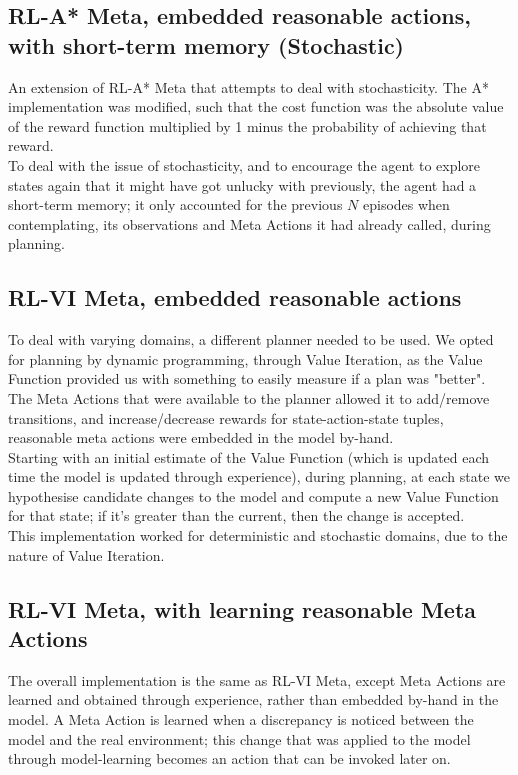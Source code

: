 \subsection{RL-A* Meta, embedded reasonable actions, with short-term memory (Stochastic)}
An extension of RL-A* Meta that attempts to deal with stochasticity. The A* implementation was modified, such that the cost function was the absolute value of the reward function multiplied by 1 minus the probability of achieving that reward.
\\To deal with the issue of stochasticity, and to encourage the agent to explore states again that it might have got unlucky with previously, the agent had a short-term memory; it only accounted for the previous $N$ episodes when contemplating, its observations and Meta Actions it had already called, during planning.
\subsection{RL-VI Meta, embedded reasonable actions}
To deal with varying domains, a different planner needed to be used. We opted for planning by dynamic programming, through Value Iteration, as the Value Function provided us with something to easily measure if a plan was "better".
\\The Meta Actions that were available to the planner allowed it to add/remove transitions, and increase/decrease rewards for state-action-state tuples, reasonable meta actions were embedded in the model by-hand.
\\Starting with an initial estimate of the Value Function (which is updated each time the model is updated through experience), during planning, at each state we hypothesise candidate changes to the model and compute a new Value Function for that state; if it's greater than the current, then the change is accepted.
\\This implementation worked for deterministic and stochastic domains, due to the nature of Value Iteration.
\subsection{RL-VI Meta, with learning reasonable Meta Actions}
The overall implementation is the same as RL-VI Meta, except Meta Actions are learned and obtained through experience, rather than embedded by-hand in the model. A Meta Action is learned when a discrepancy is noticed between the model and the real environment; this change that was applied to the model through model-learning becomes an action that can be invoked later on.


